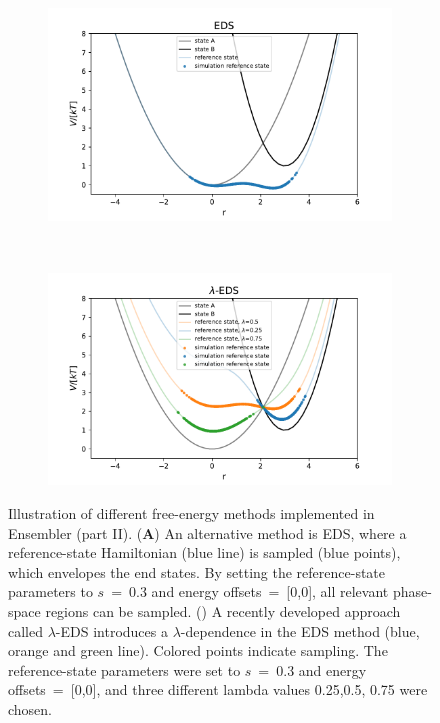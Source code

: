 %
\begin{figure}[h]
	\centering
	\begin{subfigure}{.85\textwidth}
		\caption{}
		\includegraphics[width=\linewidth]{fig/FE_example/EDS_sampling.pdf} 
	\end{subfigure}\\
	\begin{subfigure}{.85\textwidth}
		\caption{}
		\includegraphics[width=\linewidth]{fig/FE_example/hlEDS_sampling.pdf} 
	\end{subfigure}
	\caption{Illustration of different free-energy methods implemented in Ensembler (part II). (\textbf{A}) An alternative method is EDS,\cite{Christ2007, Christ2008, Christ2009} where a reference-state Hamiltonian (blue line) is sampled (blue points), which envelopes the end states. By setting the reference-state parameters to $s$~=~0.3 and energy offsets~=~[0,0], all relevant phase-space regions can be sampled. () A recently developed approach called $\lambda$-EDS\cite{Koenig2020} introduces a $\lambda$-dependence in the EDS method (blue, orange and green line). Colored points indicate sampling. The reference-state parameters were set to $s$~=~0.3 and energy offsets~=~[0,0], and three different lambda values 0.25,0.5, 0.75 were chosen.}
	\label{fig:FE_samplingb}
\end{figure}
